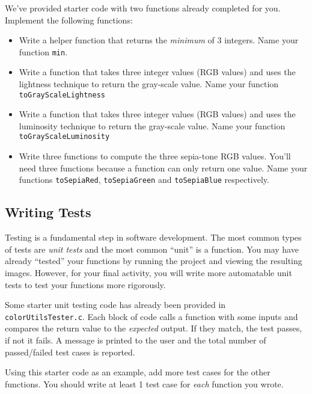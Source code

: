 \documentclass[12pt]{scrartcl}
\begin{document}
We've provided starter code with two functions already completed for
you.  Implement the following functions:

\begin{itemize}
  \item Write a helper function that returns the \emph{minimum}
  of 3 integers.  Name your function \texttt{min}.
  
  \item Write a function that takes three integer values (RGB values) and
  uses the lightness technique to return the gray-scale value.  
  Name your function \texttt{toGrayScaleLightness}

  \item Write a function that takes three integer values (RGB values) and
  uses the luminosity technique to return the gray-scale value.  
  Name your function \texttt{toGrayScaleLuminosity}

  \item Write three functions to compute the three sepia-tone RGB values.
  You'll need three functions because a function can only return one value.
  Name your functions \texttt{toSepiaRed}, \texttt{toSepiaGreen} and
  \texttt{toSepiaBlue} respectively.
\end{itemize}


\subsection{Writing Tests}

Testing is a fundamental step in software development.  The most common types
of tests are \emph{unit tests} and the most common ``unit'' is a function.
You may have already ``tested'' your functions by running the project and 
viewing the resulting images.  However, for your final activity, you will
write more automatable unit tests to test your functions more rigorously.  

Some starter unit testing code has already been provided in 
\texttt{colorUtilsTester.c}.  Each block of code calls a function
with some inputs and compares the return value to the \emph{expected}
output.  If they match, the test passes, if not it fails.  A message is
printed to the user and the total number of passed/failed test cases is
reported.  

Using this starter code as an example, add more test cases for the 
other functions.  You should write at least 1 test case for 
\emph{each} function you wrote.  
\end{document}

